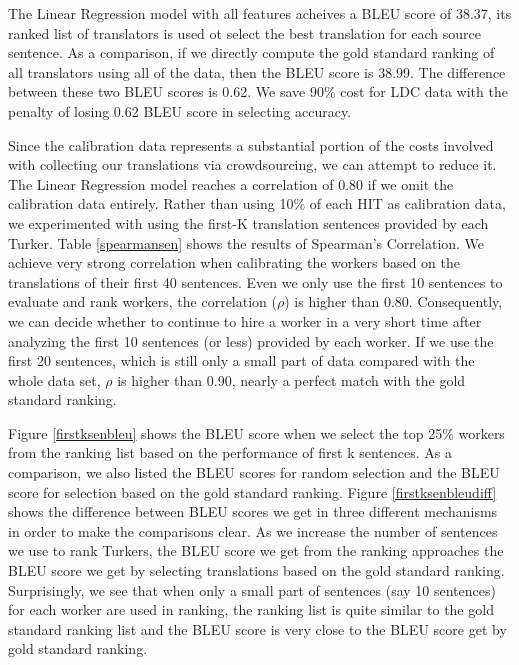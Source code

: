 \documentclass[11pt]{article}
\begin{document}
The Linear Regression model with all features acheives a BLEU score of 38.37, its ranked list of translators  is used ot select the best translation for each source sentence. As a comparison, if we directly compute the gold standard ranking of all translators using all of the data, then the BLEU score is 38.99. The difference between these two BLEU scores is 0.62. We save 90\% cost for LDC data with the penalty of losing 0.62 BLEU score in selecting accuracy.

Since the calibration data represents a substantial portion of the costs involved with collecting our translations via crowdsourcing, we can attempt to reduce it.  
 The Linear Regression model reaches a correlation of 0.80 if we omit the calibration data entirely. 
 Rather than using 10\% of each HIT as calibration data, we experimented with using the first-K translation sentences provided by each Turker.  Table \ref{spearmansen} shows the results of Spearman's Correlation.  We achieve  very strong correlation when calibrating the workers based on  the translations of their first 40 sentences.  
  Even we only use the first 10 sentences to evaluate and rank workers, the correlation ($\rho$) is higher than 0.80.  Consequently, we can decide whether to continue to hire a worker in a very short time after analyzing the first 10 sentences (or less) provided by each worker. If we use the first 20 sentences, which is still only a small  part of data compared with the whole data set, $\rho$ is higher than 0.90, nearly a perfect match with the gold standard ranking.
  
  Figure \ref{firstksenbleu}  shows the BLEU score when we select the top 25\% workers from the ranking list based on the performance of first k sentences.
  As a comparison, we also listed the  BLEU scores for random selection 
  and the BLEU score for selection based on the gold standard ranking.
 Figure \ref{firstksenbleudiff}  shows the difference between BLEU scores we get in three different mechanisms in order to make the comparisons clear.
  As we increase the number of sentences we use to rank Turkers, the BLEU score we get from the ranking approaches the BLEU score we get by selecting translations based on the gold standard ranking. Surprisingly, we see that when only a small part of sentences (say 10 sentences) for each worker are used in ranking, the ranking list  is quite similar to the gold standard ranking list and the BLEU score is very close to the BLEU score get by gold standard ranking.
  
\end{document}
